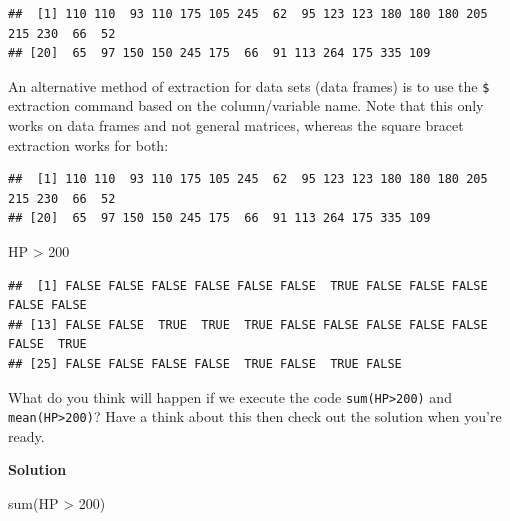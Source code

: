 \documentclass[
]{book}
\newenvironment{Shaded}{\begin{snugshade}}{\end{snugshade}}
\newcommand{\DecValTok}[1]{\textcolor[rgb]{0.00,0.00,0.81}{#1}}
\newcommand{\FunctionTok}[1]{\textcolor[rgb]{0.00,0.00,0.00}{#1}}
\newcommand{\NormalTok}[1]{#1}
\newcommand{\OtherTok}[1]{\textcolor[rgb]{0.56,0.35,0.01}{#1}}
\newcommand{\SpecialCharTok}[1]{\textcolor[rgb]{0.00,0.00,0.00}{#1}}
\theoremstyle{definition}
\theoremstyle{definition}
\theoremstyle{definition}
\theoremstyle{definition}
\theoremstyle{remark}
\begin{document}
\begin{verbatim}
##  [1] 110 110  93 110 175 105 245  62  95 123 123 180 180 180 205 215 230  66  52
## [20]  65  97 150 150 245 175  66  91 113 264 175 335 109
\end{verbatim}

An alternative method of extraction for data sets (data frames) is to use the \texttt{\$} extraction command based on the column/variable name. Note that this only works on data frames and not general matrices, whereas the square bracet extraction works for both:

\begin{Shaded}
\end{Shaded}

\begin{verbatim}
##  [1] 110 110  93 110 175 105 245  62  95 123 123 180 180 180 205 215 230  66  52
## [20]  65  97 150 150 245 175  66  91 113 264 175 335 109
\end{verbatim}

\begin{Shaded}
\begin{Highlighting}[]
\NormalTok{HP }\SpecialCharTok{\textgreater{}} \DecValTok{200}
\end{Highlighting}
\end{Shaded}

\begin{verbatim}
##  [1] FALSE FALSE FALSE FALSE FALSE FALSE  TRUE FALSE FALSE FALSE FALSE FALSE
## [13] FALSE FALSE  TRUE  TRUE  TRUE FALSE FALSE FALSE FALSE FALSE FALSE  TRUE
## [25] FALSE FALSE FALSE FALSE  TRUE FALSE  TRUE FALSE
\end{verbatim}

What do you think will happen if we execute the code \texttt{sum(HP\textgreater{}200)} and \texttt{mean(HP\textgreater{}200)}? Have a think about this then check out the solution when you're ready.

\textbf{Solution}

\begin{Shaded}
\begin{Highlighting}[]
\FunctionTok{sum}\NormalTok{(HP }\SpecialCharTok{\textgreater{}} \DecValTok{200}\NormalTok{)  }
\end{Highlighting}
\end{Shaded}
\end{document}
